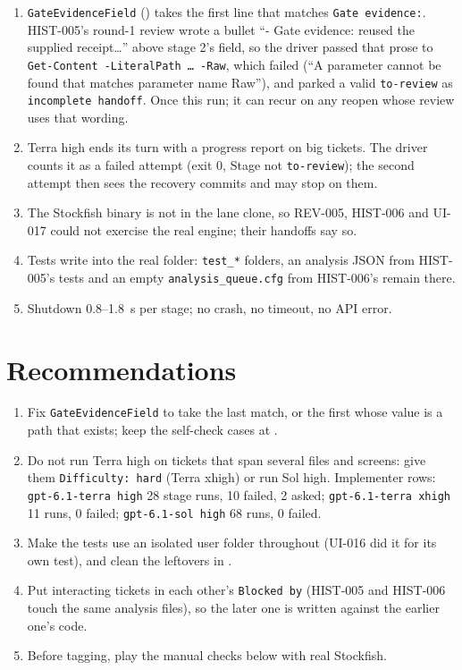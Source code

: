 \documentclass[11pt,a4paper]{article}
\begin{document}
\begin{enumerate}
  \item \texttt{GateEvidenceField} () takes the first line that matches
        \texttt{Gate evidence:}. HIST-005's round-1 review wrote a bullet ``- Gate evidence:
        reused the supplied receipt\dots'' above stage 2's field, so the driver passed that prose
        to \texttt{Get-Content -LiteralPath \dots{} -Raw}, which failed (``A parameter cannot be
        found that matches parameter name Raw''), and parked a valid \texttt{to-review} as
        \texttt{incomplete handoff}. Once this run; it can recur on any reopen whose review uses
        that wording.
  \item Terra high ends its turn with a progress report on big tickets. The driver counts it as
        a failed attempt (exit 0, Stage not \texttt{to-review}); the second attempt then sees the
        recovery commits and may stop on them.
  \item The Stockfish binary is not in the lane clone, so REV-005, HIST-006 and UI-017 could not
        exercise the real engine; their handoffs say so.
  \item Tests write into the real  folder: \texttt{test\_*} folders, an analysis JSON
        from HIST-005's tests and an empty \texttt{analysis\_queue.cfg} from HIST-006's remain there.
  \item Shutdown 0.8--1.8~s per stage; no crash, no timeout, no API error.
\end{enumerate}

\section*{Recommendations}

\begin{enumerate}
  \item Fix \texttt{GateEvidenceField} to take the last match, or the first whose value is a
        path that exists; keep the self-check cases at .
  \item Do not run Terra high on tickets that span several files and screens: give them
        \texttt{Difficulty: hard} (Terra xhigh) or run Sol high. Implementer rows:
        \texttt{gpt-6.1-terra high} 28 stage runs, 10 failed, 2 asked; \texttt{gpt-6.1-terra
        xhigh} 11 runs, 0 failed; \texttt{gpt-6.1-sol high} 68 runs, 0 failed.
  \item Make the tests use an isolated user folder throughout (UI-016 did it for its own test),
        and clean the leftovers in .
  \item Put interacting tickets in each other's \texttt{Blocked by} (HIST-005 and HIST-006 touch
        the same analysis files), so the later one is written against the earlier one's code.
  \item Before tagging, play the manual checks below with real Stockfish.
\end{enumerate}
\end{document}
